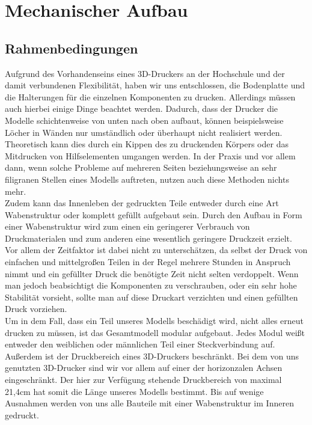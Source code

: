 \chapter{Mechanischer Aufbau}
\section{Rahmenbedingungen}
Aufgrund des Vorhandenseins eines 3D-Druckers an der Hochschule und der damit verbundenen Flexibilität, haben wir uns entschlossen, die Bodenplatte und die Halterungen für die einzelnen Komponenten zu drucken.
Allerdings müssen auch hierbei einige Dinge beachtet werden. Dadurch, dass der Drucker die Modelle schichtenweise von unten nach oben aufbaut, können beispielsweise Löcher in Wänden nur umständlich oder überhaupt nicht realisiert werden. Theoretisch kann dies durch ein Kippen des zu druckenden Körpers oder das Mitdrucken von Hilfselementen umgangen werden. In der Praxis und vor allem dann, wenn solche Probleme auf mehreren Seiten beziehungsweise an sehr filigranen Stellen eines Modells auftreten, nutzen auch diese Methoden nichts mehr.\\
Zudem kann das Innenleben der gedruckten Teile entweder durch eine Art Wabenstruktur oder komplett gefüllt aufgebaut sein. Durch den Aufbau in Form einer Wabenstruktur wird zum einen ein geringerer Verbrauch von Druckmaterialen und zum anderen eine wesentlich geringere Druckzeit erzielt. Vor allem der Zeitfaktor ist dabei nicht zu unterschätzen, da selbst der Druck von einfachen und mittelgroßen Teilen in der Regel mehrere Stunden in Anspruch nimmt und ein gefüllter Druck die benötigte Zeit nicht selten verdoppelt. Wenn man jedoch beabsichtigt die Komponenten zu verschrauben, oder ein sehr hohe Stabilität vorsieht, sollte man auf diese Druckart verzichten und einen gefüllten Druck vorziehen.\\
Um in dem Fall, dass ein Teil unseres Modells beschädigt wird, nicht alles erneut drucken zu müssen, ist das Gesamtmodell modular aufgebaut. Jedes Modul weißt entweder den weiblichen oder männlichen Teil einer Steckverbindung auf.\\
Außerdem ist der Druckbereich eines 3D-Druckers beschränkt. Bei dem von uns genutzten 3D-Drucker sind wir vor allem auf einer der horizonzalen Achsen eingeschränkt. Der hier zur Verfügung stehende Druckbereich von maximal 21,4cm hat somit die Länge unseres Modells bestimmt. Bis auf wenige Ausnahmen werden von uns alle Bauteile mit einer Wabenstruktur im Inneren gedruckt.

